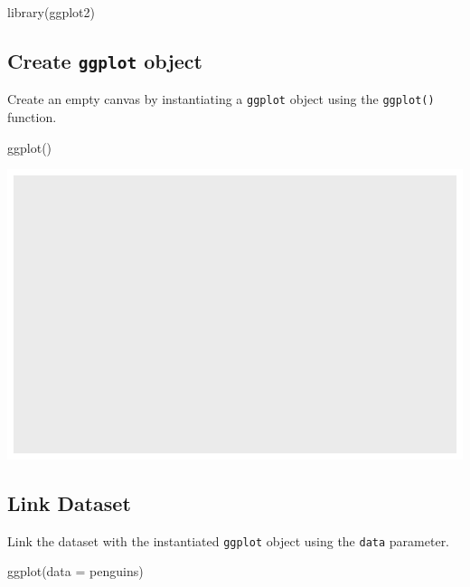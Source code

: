 \documentclass[
  letterpaper,
  DIV=11,
  numbers=noendperiod]{scrreprt}
\newenvironment{Shaded}{\begin{snugshade}}{\end{snugshade}}
\newcommand{\AttributeTok}[1]{\textcolor[rgb]{0.40,0.45,0.13}{#1}}
\newcommand{\FunctionTok}[1]{\textcolor[rgb]{0.28,0.35,0.67}{#1}}
\newcommand{\NormalTok}[1]{\textcolor[rgb]{0.00,0.23,0.31}{#1}}
\begin{document}
\begin{Shaded}
\begin{Highlighting}[]
\FunctionTok{library}\NormalTok{(ggplot2)}
\end{Highlighting}
\end{Shaded}

\subsection{\texorpdfstring{Create \texttt{ggplot}
object}{Create ggplot object}}\label{create-ggplot-object}

Create an empty canvas by instantiating a \texttt{ggplot} object using
the \texttt{ggplot()} function.

\begin{Shaded}
\begin{Highlighting}[]
\FunctionTok{ggplot}\NormalTok{()}
\end{Highlighting}
\end{Shaded}

\includegraphics{src/r-for-data-science/01-data-viz_files/figure-pdf/unnamed-chunk-7-1.pdf}

\subsection{Link Dataset}\label{link-dataset}

Link the dataset with the instantiated \texttt{ggplot} object using the
\texttt{data} parameter.

\begin{Shaded}
\begin{Highlighting}[]
\FunctionTok{ggplot}\NormalTok{(}\AttributeTok{data =}\NormalTok{ penguins)}
\end{Highlighting}
\end{Shaded}
\end{document}
